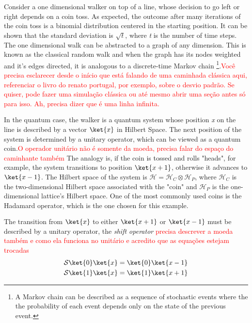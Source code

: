     	     Consider a one dimensional walker on top of a line, whose decision to go left or right depends on a coin toss. As expected, the outcome after many iterations of the coin toss is a binomial distribution centered in the starting position. It can be shown that the  standard deviation is $\sqrt{t}$, where \textit{t} is the number of time steps. The one dimensional walk can be abstracted to a graph of any dimension. This is known as the classical random walk and when the graph has its nodes weighted and it's edges directed, it is analogous to a discrete-time Markov chain \footnote{A Markov chain can be described as a sequence of stochastic events where the the probability of each event depends only on the state of the previous event.}.\textcolor{red}{Você precisa esclarecer desde o início que está falando de uma caminhada clássica aqui, referenciar o livro do renato portugal, por exemplo, sobre o desvio padrão. Se quiser, pode fazer uma simulação clássica ou até mesmo abrir uma seção antes só para isso. Ah, precisa dizer que é uma linha infinita.}\par    
             In the quantum case, the walker is a quantum system whose position \textit{x} on the line is described by a vector $\ket{x}$ in Hilbert Space. The next position of the system is determined by a unitary operator, which can be viewed as a quantum coin.\textcolor{red}{O operador unitário não é somente da moeda, precisa falar do espaço do caminhante também} The analogy is, if the coin is tossed and rolls "heads", for example, the system transitions to position $\ket{x+1}$, otherwise it advances to $\ket{x-1}$. The Hilbert space of the system is $\mathscr{H} = \mathscr{H}_{C} \otimes \mathscr{H}_{P}$, where $\mathscr{H}_{C}$ is the two-dimensional Hilbert space associated with the "coin" and $\mathscr{H}_P$ is the one-dimensional lattice's Hilbert space. One of the most commonly used coins is the Hadamard operator, which is the one chosen for this example.\par
    	        The transition from $\ket{x}$ to either $\ket{x+1}$ or $\ket{x-1}$ must be described by a unitary operator, the \textit{shift operator} \textcolor{red}{precisa descrever a moeda também e como ela funciona no unitário e acredito que as equações estejam trocadas}
                 \begin{gather}
    	            \mathcal{S} \ket{0}\ket{x} = \ket{0}\ket{x-1}\\
    	            \mathcal{S} \ket{1}\ket{x} = \ket{1}\ket{x+1}
                 \end{gather}
